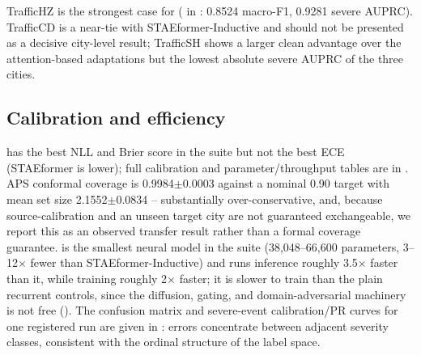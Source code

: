 TrafficHZ is the strongest case for \methodname{} ( in :
0.8524 macro-F1, 0.9281 severe AUPRC). TrafficCD is a near-tie with STAEformer-Inductive and should
not be presented as a
decisive city-level result; TrafficSH shows a larger clean advantage over the attention-based
adaptations but the lowest absolute severe AUPRC of the three cities.

\subsection{Calibration and efficiency}
\label{sec:results-calib-eff}

\methodname{} has the best NLL and Brier score in the suite but not the best ECE (STAEformer is
lower); full calibration and parameter/throughput tables are in .
APS conformal coverage is 0.9984$\pm$0.0003 against a nominal 0.90 target with mean set size
2.1552$\pm$0.0834 -- substantially over-conservative, and, because source-calibration and an unseen
target city are not guaranteed exchangeable, we report this as an observed transfer result rather
than a formal coverage guarantee. \methodname{} is the smallest neural model in the suite
(38{,}048--66{,}600 parameters, 3--12$\times$ fewer than STAEformer-Inductive) and runs inference
roughly 3.5$\times$ faster than it, while training roughly 2$\times$ faster; it is slower to train
than the plain recurrent controls, since the diffusion, gating, and domain-adversarial machinery is
not free (). The confusion matrix and severe-event calibration/PR curves for
one registered run are given in : errors concentrate between adjacent
severity classes, consistent with the ordinal structure of the label space.
